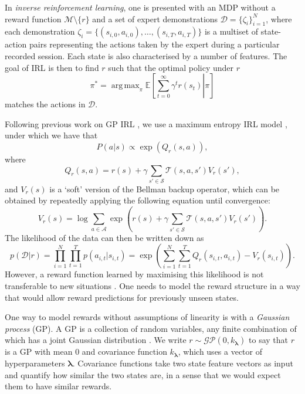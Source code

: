 \documentclass{mprop}
\theoremstyle{definition}
\DeclareMathOperator*{\argmax}{arg\,max}
\begin{document}
In \emph{inverse reinforcement learning}, one is presented with an MDP without a
reward function $\mathcal{M} \setminus \{ r \}$ and a set of expert
demonstrations $\mathcal{D} = \{ \zeta_i \}_{i=1}^N$, where each demonstration
$\zeta_i = \{ (s_{i,0}, a_{i,0}), \dots, (s_{i,T}, a_{i,T}) \}$ is a multiset of
state-action pairs representing the actions taken by the expert during a
particular recorded session. Each state is also characterised by a number of
features. The goal of IRL is then to find $r$ such that the optimal policy under
$r$
\[ \pi^* = \argmax_\pi \mathbb{E}\left[ \left. \sum_{t=0}^\infty \gamma^t r(s_t)
    \right| \pi \right] \]
matches the actions in $\mathcal{D}$.

Following previous work on GP IRL
\cite{DBLP:conf/nips/LevinePK11,DBLP:conf/uai/JinDAS17}, we use a maximum
entropy IRL model \cite{ziebart2008maximum}, under which we have that
\[ P(a | s) \propto \exp(Q_r(s, a)), \]
where
\begin{equation}
  Q_r(s, a) = r(s) + \gamma\sum_{s' \in \mathcal{S}}
  \mathcal{T}(s, a, s')V_r(s'),
\end{equation}
and $V_r(s)$ is a `soft' version of the Bellman backup operator, which can be
obtained by repeatedly applying the following equation until convergence:
\cite{DBLP:conf/nips/LevinePK11,supplementary_material}
\[ V_r(s) = \log \sum_{a \in \mathcal{A}} \exp\left( r(s) + \gamma\sum_{s' \in
      \mathcal{S}} \mathcal{T}(s, a, s')V_r(s') \right). \]
The likelihood of the data can then be written down as
\cite{DBLP:conf/uai/JinDAS17,DBLP:conf/nips/LevinePK11}
\begin{equation} \label{pDr}
  p(\mathcal{D} | r) = \prod_{i=1}^N \prod_{t=1}^T p(a_{i,t} | s_{i,t}) = \exp\left( \sum_{i=1}^N \sum_{t=1}^T Q_r(s_{i,t}, a_{i,t}) - V_r(s_{i,t}) \right).
\end{equation}
However, a reward function learned by maximising this likelihood is not
transferable to new situations
\cite{DBLP:conf/uai/JinDAS17,DBLP:conf/nips/LevinePK11}. One needs to model the
reward structure in a way that would allow reward predictions for previously
unseen states.

One way to model rewards without assumptions of linearity is with a
\emph{Gaussian process} (GP). A GP is a collection of random variables, any
finite combination of which has a joint Gaussian distribution
\cite{DBLP:books/lib/RasmussenW06}. We write $r \sim \mathcal{GP}(0,
k_{\bm\lambda})$ to say that $r$ is a GP with mean $0$ and covariance function
$k_{\bm\lambda}$, which uses a vector of hyperparameters $\bm\lambda$.
Covariance functions take two state feature vectors as input and quantify how
similar the two states are, in a sense that we would expect them to have similar
rewards.
\end{document}

